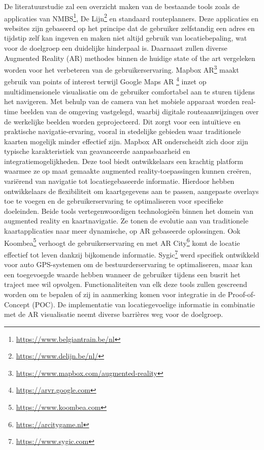   De literatuurstudie zal een overzicht maken van de bestaande tools zoals de applicaties van NMBS\footnote{\url{https://www.belgiantrain.be/nl}}, De Lijn\footnote{\url{https://www.delijn.be/nl/}} en standaard routeplanners. 
  Deze applicaties en websites zijn gebaseerd op het principe dat de gebruiker zelfstandig een adres en tijdstip zelf kan ingeven en maken niet altijd gebruik van locatiebepaling, wat voor de doelgroep een duidelijke hinderpaal is.
    Daarnaast zullen diverse Augmented Reality (AR) methodes binnen de huidige state of the art vergeleken worden voor het verbeteren van de gebruikerservaring. 
    Mapbox AR\footnote{\url{https://www.mapbox.com/augmented-reality}} maakt gebruik van points of interest terwijl Google Maps AR \footnote{\url{https://arvr.google.com}} inzet op multidimensionele visualisatie om de gebruiker comfortabel aan te sturen tijdens het navigeren. 
    Met behulp van de camera van het mobiele apparaat worden real-time beelden van de omgeving vastgelegd, waarbij digitale routeaanwijzingen over de werkelijke beelden worden geprojecteerd. 
    Dit zorgt voor een intuïtieve en praktische navigatie-ervaring, vooral in stedelijke gebieden waar traditionele kaarten mogelijk minder effectief zijn. 
    Mapbox AR onderscheidt zich door zijn typische karakteristiek van geavanceerde aanpasbaarheid en integratiemogelijkheden. 
    Deze tool biedt ontwikkelaars een krachtig platform waarmee ze op maat gemaakte augmented reality-toepassingen kunnen creëren, variërend van navigatie tot locatiegebaseerde informatie. 
    Hierdoor hebben ontwikkelaars de flexibiliteit om kaartgegevens aan te passen, aangepaste overlays toe te voegen en de gebruikerservaring te optimaliseren voor specifieke doeleinden. 
    Beide tools vertegenwoordigen technologieën binnen het domein van augmented reality en kaartnavigatie. Ze tonen de evolutie aan van traditionele kaartapplicaties naar meer dynamische, op AR gebaseerde oplossingen.  
    Ook Koombea\footnote{\url{https://www.koombea.com}} verhoogt de gebruikerservaring en met AR City\footnote{\url{https://arcitygame.nl}} komt de locatie effectief tot leven dankzij bijkomende informatie. 
    Sygic\footnote{\url{https://www.sygic.com}} werd specifiek ontwikkeld voor auto GPS-systemen om de bestuurderservaring te optimaliseren, maar kan een toegevoegde waarde hebben wanneer de gebruiker tijdens een busrit het traject mee wil opvolgen. 
    Functionaliteiten van elk deze tools zullen gescreend worden om te bepalen of zij in aanmerking komen voor integratie in de Proof-of-Concept (POC). 
    De implementatie van locatiegevoelige informatie in combinatie met de AR visualisatie neemt diverse barrières weg voor de doelgroep. 
